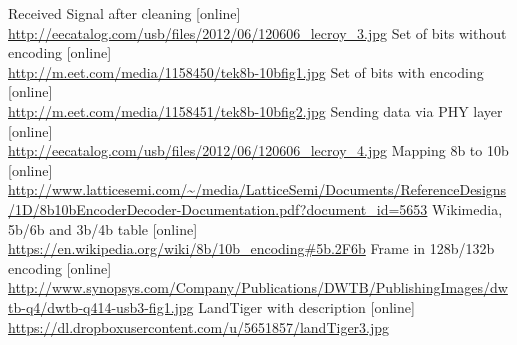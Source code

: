 \documentclass{BscUS}
\begin{document}
\begin{thebibliography}{1}
 Received Signal after cleaning [online]\\
\url{http://eecatalog.com/usb/files/2012/06/120606_lecroy_3.jpg}
 Set of bits without encoding [online] \\
\url{http://m.eet.com/media/1158450/tek8b-10bfig1.jpg}
 Set of bits with encoding [online] \\
\url{http://m.eet.com/media/1158451/tek8b-10bfig2.jpg}
 Sending data via PHY layer [online] \\
\url{http://eecatalog.com/usb/files/2012/06/120606_lecroy_4.jpg}
 Mapping 8b to 10b [online] \\
\url{http://www.latticesemi.com/~/media/LatticeSemi/Documents/ReferenceDesigns/1D/8b10bEncoderDecoder-Documentation.pdf?document_id=5653}
 Wikimedia, 5b/6b and 3b/4b table [online] \\
\url{https://en.wikipedia.org/wiki/8b/10b_encoding#5b.2F6b}
 Frame in 128b/132b encoding [online] \\
\url{http://www.synopsys.com/Company/Publications/DWTB/PublishingImages/dwtb-q4/dwtb-q414-usb3-fig1.jpg}
 LandTiger with description [online] \\
\url{https://dl.dropboxusercontent.com/u/5651857/landTiger3.jpg}
\end{thebibliography}
\end{document}
